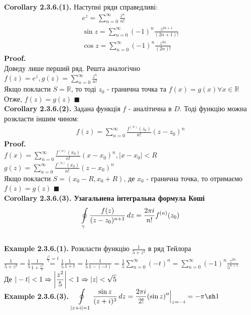 \documentclass[a4paper, 14pt]{extarticle}
\def\hugespace{\vspace{5mm} \\}
\begin{document}
	\textbf{Corollary 2.3.6.(1).} Наступні ряди справедливі:
	\begin{align*}
e^z = \sum_{n=0}^{\infty} \frac{z^n}{n!}\\
\sin z = \sum_{n=0}^{\infty} (-1)^n \frac{z^{2n+1}}{(2n+1)!}\\
\cos z = \sum_{n=0}^{\infty} (-1)^n \frac{z^{2n}}{(2n)!}
	\end{align*}
	\textbf{Proof.}\\
	Доведу лише перший ряд. Решта аналогічно\\
	$f(z) = e^z, g(z)=\displaystyle \sum_{n=0}^{\infty} \frac{z^n}{n!}$\\
	Якщо покласти $S=\mathbb{R}$, то тоді $z_0$ - гранична точка та $f(x)=g(x) \forall x \in \mathbb{R}$\\
	Отже, $f(z)=g(z)$ $\blacksquare$
	\hugespace
	\textbf{Corollary 2.3.6.(2).} Задана функція $f$ - аналітична в $D$. Тоді функцію можна розкласти іншим чином:
	\begin{align*}
	f(z) = \sum_{n=0}^{\infty} \frac{f^{(n)}(z_0)}{n!} (z-z_0)^n
	\end{align*}
	\textbf{Proof.}\\
	$f(x)=\displaystyle \sum_{n=0}^{\infty} \frac{f^{(n)}(x_0)}{n!} (x-x_0)^n, |x-x_0|<R$\\ $\displaystyle g(z)=\sum_{n=0}^{\infty} \frac{f^{(n)}(x_0)}{n!} (z-x_0)^n$\\
	Якщо покласти $S=(x_0-R, x_0+R)$, де $x_0$ - гранична точка, то отримаємо $f(z)=g(z)$ $\blacksquare$
	\hugespace
	\textbf{Corollary 2.3.6.(3). Узагальнена інтегральна формула Коші}
	\begin{align*}
	\oint\displaylimits_{\gamma} \frac{f(z)}{(z-z_0)^{n+1}}\,dz = \frac{2 \pi i}{n!} f^{(n)}(z_0)
	\end{align*}
	\hugespace
	\textbf{Example 2.3.6.(1).} Розкласти функцію $\displaystyle \frac{1}{5+z^2}$ в ряд Тейлора\\
	$\displaystyle \frac{1}{5+z^2} = \frac{1}{5} \frac{1}{1 + \frac{z^2}{5}} \overset{\textstyle \frac{z^2}{5} = t}{=} \frac{1}{5} \frac{1}{1+t} = \frac{1}{5} \frac{1}{1-(-t)} = \frac{1}{5} \sum_{n=0}^{\infty} (-t)^n = \sum_{n=0}^{\infty} (-1)^n \frac{z^{2n}}{5^{n+1}}$\\
	Де $\displaystyle |-t|<1 \Rightarrow \abs{\frac{z^2}{5}} < 1 \Rightarrow |z| < \sqrt{5}$
	\hugespace
	
	\textbf{Example 2.3.6.(3).} $\displaystyle \oint\displaylimits_{|z+i|=1} \frac{\sin z}{(z+i)^3} \,dz = \frac{2\pi i}{2!} (\sin z)'' \Big|_{z=-i} = -\pi \sh 1$
	\hugespace
	
\end{document}
